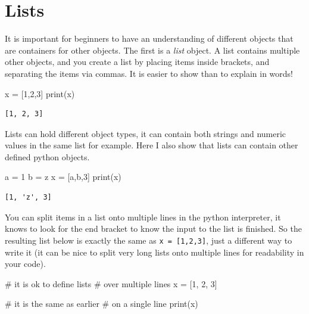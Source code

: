 \documentclass[
  letterpaper,
]{scrbook}
\newenvironment{Shaded}{\begin{snugshade}}{\end{snugshade}}
\newcommand{\BuiltInTok}[1]{\textcolor[rgb]{0.00,0.23,0.31}{#1}}
\newcommand{\CommentTok}[1]{\textcolor[rgb]{0.37,0.37,0.37}{#1}}
\newcommand{\DecValTok}[1]{\textcolor[rgb]{0.68,0.00,0.00}{#1}}
\newcommand{\NormalTok}[1]{\textcolor[rgb]{0.00,0.23,0.31}{#1}}
\newcommand{\OperatorTok}[1]{\textcolor[rgb]{0.37,0.37,0.37}{#1}}
\newcommand{\StringTok}[1]{\textcolor[rgb]{0.13,0.47,0.30}{#1}}
\begin{document}
\section{Lists}\label{lists}

It is important for beginners to have an understanding of different
objects that are containers for other objects. The first is a
\emph{list} object. A list contains multiple other objects, and you
create a list by placing items inside brackets, and separating the items
via commas. It is easier to show than to explain in words!

\begin{Shaded}
\begin{Highlighting}[]
\NormalTok{x }\OperatorTok{=}\NormalTok{ [}\DecValTok{1}\NormalTok{,}\DecValTok{2}\NormalTok{,}\DecValTok{3}\NormalTok{]}
\BuiltInTok{print}\NormalTok{(x)}
\end{Highlighting}
\end{Shaded}

\begin{verbatim}
[1, 2, 3]
\end{verbatim}

Lists can hold different object types, it can contain both strings and
numeric values in the same list for example. Here I also show that lists
can contain other defined python objects.

\begin{Shaded}
\begin{Highlighting}[]
\NormalTok{a }\OperatorTok{=} \DecValTok{1}
\NormalTok{b }\OperatorTok{=} \StringTok{\textquotesingle{}z\textquotesingle{}}
\NormalTok{x }\OperatorTok{=}\NormalTok{ [a,b,}\DecValTok{3}\NormalTok{]}
\BuiltInTok{print}\NormalTok{(x)}
\end{Highlighting}
\end{Shaded}

\begin{verbatim}
[1, 'z', 3]
\end{verbatim}

You can split items in a list onto multiple lines in the python
interpreter, it knows to look for the end bracket to know the input to
the list is finished. So the resulting list below is exactly the same as
\texttt{x\ =\ {[}1,2,3{]}}, just a different way to write it (it can be
nice to split very long lists onto multiple lines for readability in
your code).

\begin{Shaded}
\begin{Highlighting}[]
\CommentTok{\# it is ok to define lists}
\CommentTok{\# over multiple lines}
\NormalTok{x }\OperatorTok{=}\NormalTok{ [}\DecValTok{1}\NormalTok{,}
     \DecValTok{2}\NormalTok{,}
     \DecValTok{3}\NormalTok{]}

\CommentTok{\# it is the same as earlier}
\CommentTok{\# on a single line}
\BuiltInTok{print}\NormalTok{(x)}
\end{Highlighting}
\end{Shaded}
\end{document}
